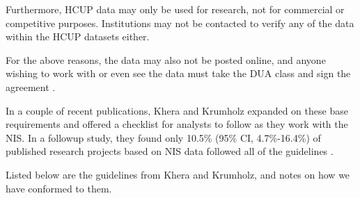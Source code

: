 \documentclass[12pt]{ociamthesis}\usepackage[]{graphicx}\usepackage[]{color}
\begin{document}
Furthermore, HCUP data may only be used for research, not for commercial or competitive purposes. Institutions may not be contacted
to verify any of the data within the HCUP datasets either. 

For the above reasons, the data may also not be posted online, and anyone wishing to work with or even see the data must take the DUA class and
sign the agreement \cite{HCUPDUA}.

In a couple of recent publications, Khera and Krumholz expanded on these base requirements and offered a checklist \cite{Krumholz2017} 
for analysts to follow as they work with the NIS. In a followup study, they found only 10.5\% (95\% CI, 4.7\%-16.4\%) of published research
projects based on NIS data followed all of the guidelines \cite{Khera2017}.

Listed below are the guidelines from Khera and Krumholz, and notes on how we have conformed to them.
\end{document}
